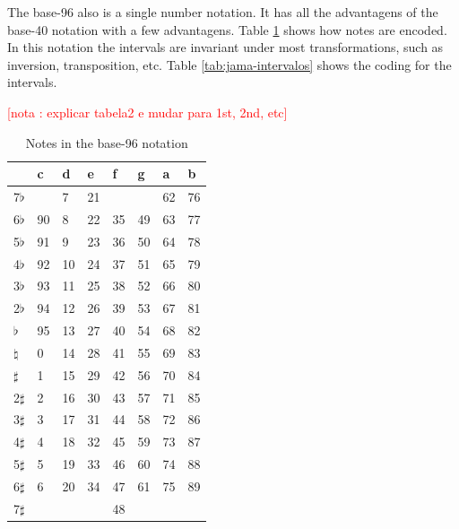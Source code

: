 \documentclass{article}
\newcounter{notacounter}
\newcommand{\nota}[1]{
  \addtocounter{notacounter}{1}
  \textcolor{red}{[nota \arabic{notacounter}: #1]}
}
\begin{document}
The base-96 also is a single number notation. It has all the
advantagens of the base-40 notation with a few advantagens. Table
\ref{tab:jama-notas} shows how notes are encoded. In this notation the
intervals are invariant under most transformations, such as inversion,
transposition, etc. Table \ref{tab:jama-intervalos} shows the coding
for the intervals. \nota{explicar tabela2 e mudar para 1st, 2nd, etc}

\begin{table}
  \centering
  \begin{tabular}{l|lllllll}
               & c & d& e& f& g& a& b \\
    \hline
    7$\flat$   &   & 7&21&  &  &62&76 \\
    6$\flat$   & 90& 8&22&35&49&63&77 \\
    5$\flat$   & 91& 9&23&36&50&64&78 \\
    4$\flat$   & 92&10&24&37&51&65&79 \\
    3$\flat$   & 93&11&25&38&52&66&80 \\
    2$\flat$   & 94&12&26&39&53&67&81 \\
    $\flat$    & 95&13&27&40&54&68&82 \\
    $\natural$ &  0&14&28&41&55&69&83 \\
    $\sharp$   &  1&15&29&42&56&70&84 \\
    2$\sharp$  &  2&16&30&43&57&71&85 \\
    3$\sharp$  &  3&17&31&44&58&72&86 \\
    4$\sharp$  &  4&18&32&45&59&73&87 \\
    5$\sharp$  &  5&19&33&46&60&74&88 \\
    6$\sharp$  &  6&20&34&47&61&75&89 \\
    7$\sharp$  &   &  &  &48&  &  &   \\
  \end{tabular}
  \caption{Notes in the base-96 notation}
  \label{tab:jama-notas}
\end{table}
\end{document}
